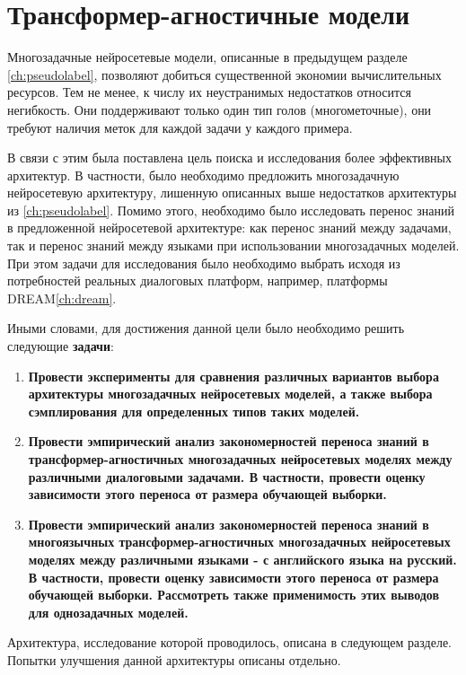 \chapter{Трансформер-агностичные модели}\label{ch:tr-ag}
Многозадачные нейросетевые модели, описанные в предыдущем разделе \ref{ch:pseudolabel}, позволяют добиться существенной экономии вычислительных ресурсов. Тем не менее, к числу их неустранимых недостатков относится негибкость. Они поддерживают только один тип голов (многометочные), они требуют наличия меток для каждой задачи у каждого примера.

В связи с этим была поставлена цель поиска и исследования более эффективных архитектур. В частности, было необходимо предложить многозадачную нейросетевую архитектуру, лишенную описанных выше недостатков архитектуры из \ref{ch:pseudolabel}. Помимо этого, необходимо было исследовать перенос знаний в предложенной нейросетевой архитектуре: как перенос знаний между задачами, так и перенос знаний между языками при использовании многозадачных моделей. При этом задачи для исследования было необходимо выбрать исходя из потребностей реальных диалоговых платформ, например, платформы DREAM\ref{ch:dream}. 

Иными словами, для достижения данной цели было необходимо решить следующие \textbf{задачи}:
\begin{enumerate}
  \item \textbf{Провести эксперименты для сравнения различных вариантов выбора архитектуры многозадачных нейросетевых моделей, а также выбора сэмплирования для определенных типов таких моделей.}
  \item \textbf{Провести эмпирический анализ закономерностей переноса знаний в трансформер-агностичных многозадачных нейросетевых моделях между различными диалоговыми задачами. В частности, провести оценку зависимости этого переноса от размера обучающей выборки.}
  \item \textbf{Провести эмпирический анализ закономерностей переноса знаний в многоязычных трансформер-агностичных многозадачных нейросетевых моделях между различными языками - с английского языка на русский. В частности, провести оценку зависимости этого переноса от размера обучающей выборки. Рассмотреть также применимость этих выводов для однозадачных моделей.}
\end{enumerate}


Архитектура, исследование которой проводилось, описана в следующем разделе. Попытки улучшения данной архитектуры описаны отдельно. 

